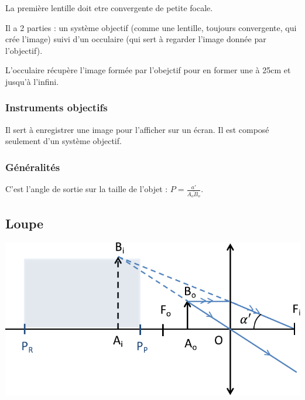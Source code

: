\documentclass[french]{yLectureNote}
\begin{document}
La première lentille doit etre convergente de petite focale.

Il a 2 parties : un système objectif (comme une lentille, toujours convergente, qui crée l'image) suivi d'un occulaire (qui sert à regarder l'image donnée par l'objectif).

L'occulaire récupère l'image formée par l'obejctif pour en former une à 25cm et jusqu'à l'infini.

\subsubsection{Instruments objectifs}
Il sert à enregistrer une image pour l'afficher sur un écran. Il est composé seulement d'un système objectif.
\subsubsection{Généralités}
\begin{definition}[Puissance]
C'est l'angle de sortie sur la taille de l'objet : \(P = \frac{a'}{\bar{A_oB_o}}\).
\end{definition}
\subsection{Loupe}
\includegraphics[scale=0.5]{c1}
\end{document}
